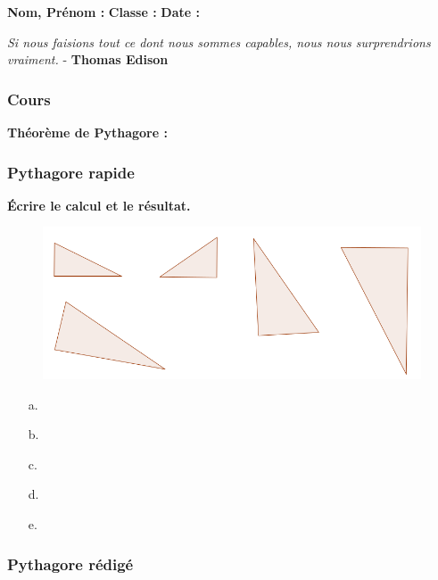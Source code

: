 



\textbf{Nom, Prénom :} \hspace{8cm} \textbf{Classe :} \hspace{3cm} \textbf{Date :}\\

\begin{center}
  \textit{Si nous faisions tout ce dont nous sommes capables, nous nous surprendrions vraiment.}  - \textbf{Thomas Edison}
\end{center}

\subsubsection*{Cours}
\textbf{Théorème de Pythagore : } \dotfill \\
\Pointilles[1]

\subsubsection*{Pythagore rapide}
\textbf{Écrire le calcul et le résultat.}
  
\begin{figure}[H]
  \centering
  \includegraphics[width=0.8\linewidth]{4x6-Pythagore/ex2.png}
\end{figure}

\begin{multicols}{5}
  \begin{enumerate}
  \item[a.] \dotfill 
  \item[b.] \dotfill
  \item[c.] \dotfill 
  \item[d.] \dotfill 
  \item[e.] \dotfill 
  \end{enumerate}
\end{multicols}
\Pointilles[1]

\subsubsection*{Pythagore rédigé}

